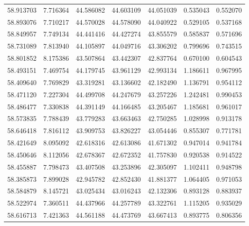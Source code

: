 \begin{tabular}{rrrrrrr}
 58.913703 &   7.716364 &         44.586082 &         44.603109 &         44.051039 &  0.535043 &  0.552070 \\
 58.893076 &   7.710217 &         44.570028 &         44.578090 &         44.040922 &  0.529105 &  0.537168 \\
 58.849957 &   7.749134 &         44.441416 &         44.427274 &         43.855579 &  0.585837 &  0.571696 \\
 58.731089 &   7.813940 &         44.105897 &         44.049716 &         43.306202 &  0.799696 &  0.743515 \\
 58.801852 &   8.175386 &         43.507864 &         43.442307 &         42.837764 &  0.670100 &  0.604543 \\
 58.493151 &   7.469754 &         44.179745 &         43.961129 &         42.993134 &  1.186611 &  0.967995 \\
 58.409640 &   7.769829 &         43.319281 &         43.136602 &         42.182490 &  1.136791 &  0.954112 \\
 58.471120 &   7.227304 &         44.499708 &         44.247679 &         43.257226 &  1.242481 &  0.990453 \\
 58.486477 &   7.330838 &         44.391149 &         44.166485 &         43.205467 &  1.185681 &  0.961017 \\
 58.573835 &   7.788439 &         43.779283 &         43.663463 &         42.750285 &  1.028998 &  0.913178 \\
 58.646418 &   7.816112 &         43.909753 &         43.826227 &         43.054446 &  0.855307 &  0.771781 \\
 58.421649 &   8.095092 &         42.618316 &         42.613086 &         41.671302 &  0.947014 &  0.941784 \\
 58.450646 &   8.112056 &         42.678367 &         42.672352 &         41.757830 &  0.920538 &  0.914522 \\
 58.455887 &   7.798473 &         43.407508 &         43.253896 &         42.305097 &  1.102411 &  0.948798 \\
 58.385873 &   7.899028 &         42.945782 &         42.852430 &         41.881377 &  1.064405 &  0.971053 \\
 58.584879 &   8.145721 &         43.025434 &         43.016243 &         42.132306 &  0.893128 &  0.883937 \\
 58.522974 &   7.360511 &         44.437966 &         44.257789 &         43.322761 &  1.115205 &  0.935029 \\
 58.616713 &   7.421363 &         44.561188 &         44.473769 &         43.667413 &  0.893775 &  0.806356 \\

\end{tabular}
